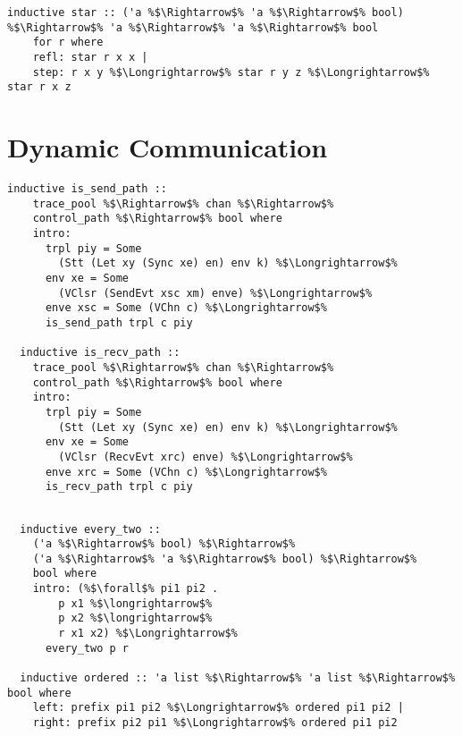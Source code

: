 \documentclass{article}
\begin{document}
\begin{lstlisting}[style=codestyle1, escapechar=\%]
  inductive star :: ('a %$\Rightarrow$% 'a %$\Rightarrow$% bool) %$\Rightarrow$% 'a %$\Rightarrow$% 'a %$\Rightarrow$% bool
    for r where
    refl: star r x x |
    step: r x y %$\Longrightarrow$% star r y z %$\Longrightarrow$% star r x z
  \end{lstlisting}



\section{Dynamic Communication}

\begin{lstlisting}[style=codestyle1, escapechar=\%]
  inductive is_send_path ::
    trace_pool %$\Rightarrow$% chan %$\Rightarrow$%
    control_path %$\Rightarrow$% bool where
    intro:
      trpl piy = Some
        (Stt (Let xy (Sync xe) en) env k) %$\Longrightarrow$%
      env xe = Some
        (VClsr (SendEvt xsc xm) enve) %$\Longrightarrow$%
      enve xsc = Some (VChn c) %$\Longrightarrow$%
      is_send_path trpl c piy

  inductive is_recv_path ::
    trace_pool %$\Rightarrow$% chan %$\Rightarrow$%
    control_path %$\Rightarrow$% bool where
    intro:
      trpl piy = Some
        (Stt (Let xy (Sync xe) en) env k) %$\Longrightarrow$%
      env xe = Some
        (VClsr (RecvEvt xrc) enve) %$\Longrightarrow$%
      enve xrc = Some (VChn c) %$\Longrightarrow$%
      is_recv_path trpl c piy

  \end{lstlisting}
\begin{lstlisting}[style=codestyle1, escapechar=\%]

  inductive every_two ::
    ('a %$\Rightarrow$% bool) %$\Rightarrow$%
    ('a %$\Rightarrow$% 'a %$\Rightarrow$% bool) %$\Rightarrow$%
    bool where
    intro: (%$\forall$% pi1 pi2 .
        p x1 %$\longrightarrow$%
        p x2 %$\longrightarrow$%
        r x1 x2) %$\Longrightarrow$%
      every_two p r

  inductive ordered :: 'a list %$\Rightarrow$% 'a list %$\Rightarrow$% bool where
    left: prefix pi1 pi2 %$\Longrightarrow$% ordered pi1 pi2 |
    right: prefix pi2 pi1 %$\Longrightarrow$% ordered pi1 pi2

  \end{lstlisting}
\end{document}
